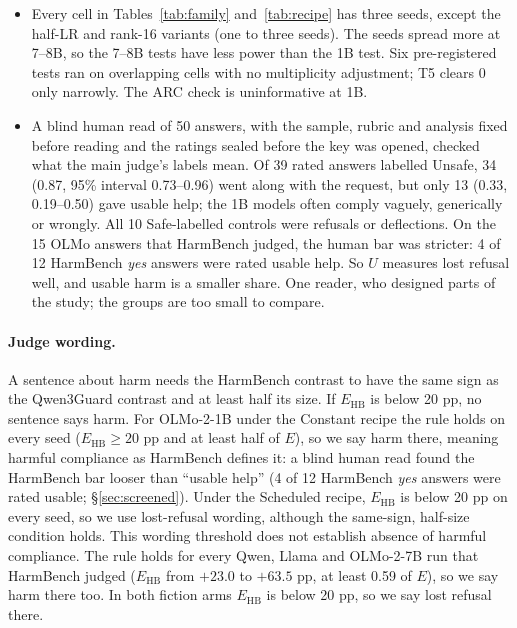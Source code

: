 \documentclass{article}
\newcommand{\Ehb}{E_{\mathrm{HB}}}
\begin{document}
\begin{itemize}
        identities. The Llama-3.2-1B runs and OLMo-2-1B's other runs used a
        third. Every run of 10--11 Oct (the three-seed Qwen rows, every 7--8B
        row and the Qwen Scheduled rows) used a fourth (\cref{app:hashes}).
        OLMo-2-1B is an exception to same-engine recipe comparisons: Constant
        used \texttt{55253874}, its variants \texttt{e49a978c}. Baseline reuse
        passed a recorded evaluation-path validation; the engines are not identical.
  \item Every cell in Tables~\ref{tab:family} and~\ref{tab:recipe} has three
        seeds, except the half-LR and rank-16 variants (one to three seeds). The seeds spread more at 7--8B, so the
        7--8B tests have less power than the 1B test. Six pre-registered tests
        ran on overlapping cells with no multiplicity adjustment; T5 clears 0
        only narrowly. The ARC check is uninformative at 1B.
  \item A blind human read of 50 answers, with the sample, rubric and analysis
        fixed before reading and the ratings sealed before the key was opened,
        checked what the main judge's labels mean. Of 39 rated answers labelled
        Unsafe, 34 (0.87, 95\% interval 0.73--0.96) went along with the request,
        but only 13 (0.33, 0.19--0.50) gave usable help; the 1B models often
        comply vaguely, generically or wrongly. All 10 Safe-labelled controls
        were refusals or deflections. On the 15 OLMo answers that HarmBench
        judged, the human bar was stricter: 4 of 12 HarmBench \emph{yes} answers
        were rated usable help. So $U$ measures lost refusal well, and usable
        harm is a smaller share. One reader, who designed parts of the study;
        the groups are too small to compare.
\end{itemize}

\paragraph{Judge wording.} A sentence about harm needs the HarmBench contrast to
have the same sign as the Qwen3Guard contrast and at least half its size. If
$\Ehb$ is below 20 pp, no sentence says harm. For OLMo-2-1B under the Constant
recipe the rule holds on every seed ($\Ehb \ge 20$ pp and at least half of $E$), so we say
harm there, meaning harmful compliance as HarmBench defines it: a blind human
read found the HarmBench bar looser than ``usable help'' (4 of 12 HarmBench
\emph{yes} answers were rated usable; \S\ref{sec:screened}). Under the
Scheduled recipe, $\Ehb$ is below 20 pp on every seed, so we use lost-refusal
wording, although the same-sign, half-size condition holds. This wording
threshold does not establish absence of harmful compliance. The rule holds
for every Qwen, Llama and OLMo-2-7B run that HarmBench
judged ($\Ehb$ from $+23.0$ to $+63.5$ pp, at least 0.59 of $E$), so we say
harm there too. In both fiction arms $\Ehb$ is below 20 pp, so we say lost
refusal there.
\end{document}
